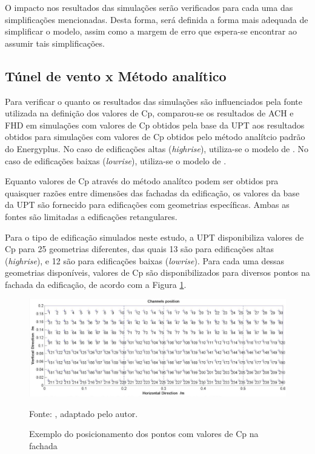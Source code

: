 \documentclass[brazil,hardcopy,openany,a5paper]{ufscthesis}
\begin{document}
		O impacto nos resultados das simulações serão verificados para cada uma das simplificações mencionadas. Desta forma, será definida a forma mais adequada de simplificar o modelo, assim como a margem de erro que espera-se encontrar ao assumir tais simplificações.
		
		\subsection{Túnel de vento x Método analítico}
		
		Para verificar o quanto os resultados das simulações são influenciados pela fonte utilizada na definição dos valores de Cp, comparou-se os resultados de ACH e FHD em simulações com valores de Cp obtidos pela base da UPT aos resultados obtidos para simulações com valores de Cp obtidos pelo método analítcio padrão do Energyplus.
		No caso de edificações altas (\textit{highrise}), utiliza-se o modelo de  \cite{Atkins}. No caso de edificações baixas (\textit{lowrise}), utiliza-se o modelo de  \cite{SwamiChandra}.
		
		Equanto valores de Cp através do método analítco podem ser obtidos pra quaisquer razões entre dimensões das fachadas da edificação, os valores da base da UPT são fornecido para edificações com geometrias específicas. Ambas as fontes são limitadas a edificações retangulares.
		
		Para o tipo de edificação simulados neste estudo, a UPT disponibiliza valores de Cp para 25 geometrias diferentes, das quais 13 são para edificações altas (\textit{highrise}), e 12 são para edificações baixas (\textit{lowrise}). Para cada uma dessas geometrias disponíveis, valores de Cp são disponibilizados para diversos pontos na fachada da edificação, de acordo com a Figura \ref{fig:tpupoints}.
		
		\begin{figure}[h]
			\centering
			\caption{Exemplo do posicionamento dos pontos com valores de Cp na fachada}
			\includegraphics[width=1\linewidth]{img/tpu_points.png}
			\label{fig:tpupoints}
			\begin{flushleft}
				Fonte:  \cite{TPU2018}, adaptado pelo autor.
			\end{flushleft}
		\end{figure}
		
\end{document}
